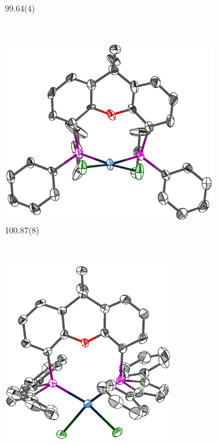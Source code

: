 \begin{figure}[htbp]
\begin{subfigure}[b]{0.45\textwidth}
                \caption{99.64(4)\degrees}
                \label{PtCl2BINAP}
        \end{subfigure}
        \\
        \begin{subfigure}[b]{0.45\textwidth}
                \includegraphics[width=\textwidth]{../Othercrystals/PtCl2/730506.eps}
                \caption{100.87(8)\degrees}
                \label{PtCl2Cy}
        \end{subfigure}%
        ~ 
        \begin{subfigure}[b]{0.45\textwidth}
                \includegraphics[width=0.8\textwidth]{../Othercrystals/PtCl2/687181.eps}

\end{subfigure}
\end{figure}
